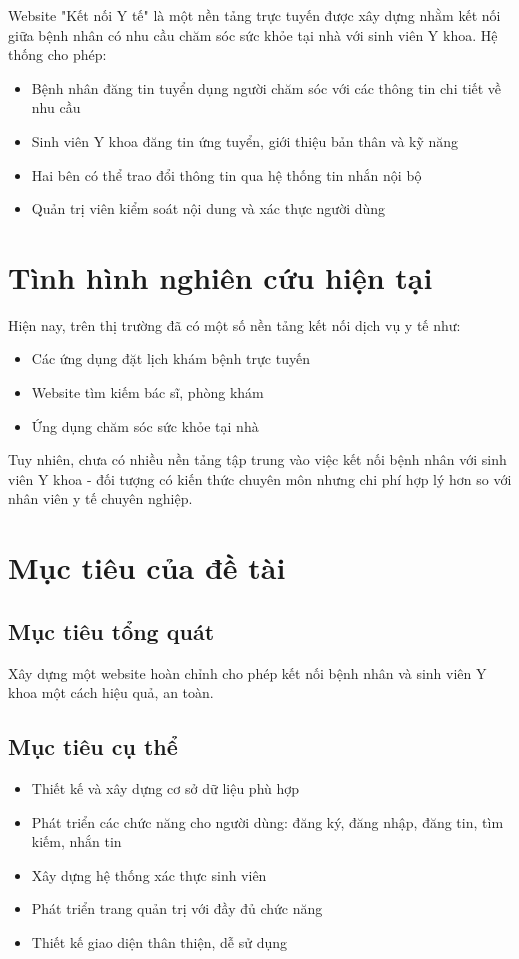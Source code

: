 \documentclass[a4paper,12pt]{report}
\begin{document}
Website "Kết nối Y tế" là một nền tảng trực tuyến được xây dựng nhằm kết nối giữa bệnh nhân có nhu cầu chăm sóc sức khỏe tại nhà với sinh viên Y khoa. Hệ thống cho phép:

\begin{itemize}
    \item Bệnh nhân đăng tin tuyển dụng người chăm sóc với các thông tin chi tiết về nhu cầu
    \item Sinh viên Y khoa đăng tin ứng tuyển, giới thiệu bản thân và kỹ năng
    \item Hai bên có thể trao đổi thông tin qua hệ thống tin nhắn nội bộ
    \item Quản trị viên kiểm soát nội dung và xác thực người dùng
\end{itemize}

\section{Tình hình nghiên cứu hiện tại}

Hiện nay, trên thị trường đã có một số nền tảng kết nối dịch vụ y tế như:
\begin{itemize}
    \item Các ứng dụng đặt lịch khám bệnh trực tuyến
    \item Website tìm kiếm bác sĩ, phòng khám
    \item Ứng dụng chăm sóc sức khỏe tại nhà
\end{itemize}

Tuy nhiên, chưa có nhiều nền tảng tập trung vào việc kết nối bệnh nhân với sinh viên Y khoa - đối tượng có kiến thức chuyên môn nhưng chi phí hợp lý hơn so với nhân viên y tế chuyên nghiệp.

\section{Mục tiêu của đề tài}

\subsection{Mục tiêu tổng quát}
Xây dựng một website hoàn chỉnh cho phép kết nối bệnh nhân và sinh viên Y khoa một cách hiệu quả, an toàn.

\subsection{Mục tiêu cụ thể}
\begin{itemize}
    \item Thiết kế và xây dựng cơ sở dữ liệu phù hợp
    \item Phát triển các chức năng cho người dùng: đăng ký, đăng nhập, đăng tin, tìm kiếm, nhắn tin
    \item Xây dựng hệ thống xác thực sinh viên
    \item Phát triển trang quản trị với đầy đủ chức năng
    \item Thiết kế giao diện thân thiện, dễ sử dụng
\end{itemize}
\end{document}
